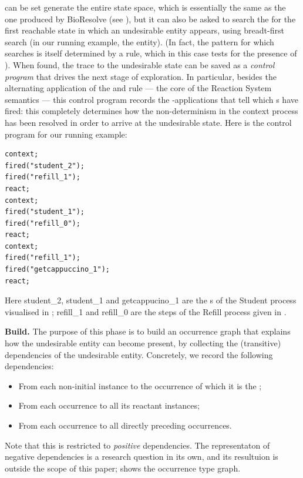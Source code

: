 \GROOVE can be set generate the entire state space, which is essentially the same as the one produced by BioResolve (see ), but it can also be asked to search the for the first reachable state in which an undesirable entity appears, using breadt-first search (in our running example, the \anger{} entity). (In fact, the pattern for which \GROOVE searches is itself determined by a rule, which in this case tests for the presence of \anger). When found, the trace to the undesirable state can be saved as a \emph{control program} that drives the next stage of \GROOVE exploration. In particular, besides the alternating application of the \contextR and \reactR rule --- the core of the Reaction System semantics --- this control program records the \firedR-applications that tell which \Step{}s have fired: this completely determines how the non-determinism in the context process has been resolved in order to arrive at the undesirable state. Here is the control program for our running example:

\begin{center}
\begin{lstlisting}[basicstyle=\sffamily\small,columns=fullflexible,xleftmargin=1cm]
context;
fired("student_2");
fired("refill_1");
react;
context;
fired("student_1");
fired("refill_0");
react;
context;
fired("refill_1");
fired("getcappuccino_1");
react;
\end{lstlisting}
\end{center}
%
Here \textsf{student\_2}, \textsf{student\_1} and \textsf{getcappucino\_1} are the \Step{}s of the \textsf{Student} process visualised in ; \textsf{refill\_1} and \textsf{refill\_0} are the steps of the \textsf{Refill} process given in .

\medskip\noindent\textbf{Build.}
%
The purpose of this phase is to build an occurrence graph that explains how the undesirable entity can become present, by collecting the (transitive) dependencies of the undesirable \anger entity. Concretely, we record the following dependencies:
\begin{itemize}
\item From each non-initial \Entity instance to the \Rule occurrence of which it is the \product;
\item From each \Rule occurrence to all its reactant \Entity instances;
\item From each \Rule occurrence to all directly preceding \Step occurrences.
\end{itemize}
%
Note that this is restricted to \emph{positive} dependencies. The representaton of negative dependencies is a research question in its own, and its resultuion is outside the scope of this paper;  shows the occurrence type graph. 

